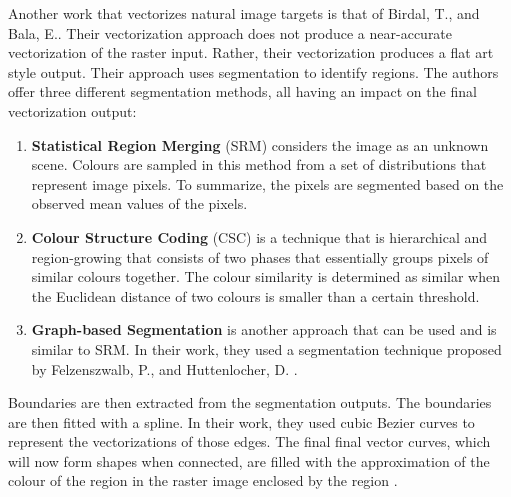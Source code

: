 Another work that vectorizes natural image targets is that of Birdal, T., and Bala, E.. Their vectorization approach does not produce a near-accurate vectorization of the raster input. Rather, their vectorization produces a flat art style output. Their approach uses segmentation to identify regions. The authors offer three different segmentation methods, all having an impact on the final vectorization output:

\begin{enumerate}
	\item \textbf{Statistical Region Merging} (SRM) considers the image as an unknown scene. Colours are sampled in this method from a set of distributions that represent image pixels. To summarize, the pixels are segmented based on the observed mean values of the pixels.
	
	\item \textbf{Colour Structure Coding} (CSC) is a technique that is hierarchical and region-growing that consists of two phases that essentially groups pixels of similar colours together. The colour similarity is determined as similar when the Euclidean distance of two colours is smaller than a certain threshold.
	
	\item \textbf{Graph-based Segmentation} is another approach that can be used and is similar to SRM. In their work, they used a segmentation technique proposed by Felzenszwalb, P., and Huttenlocher, D. \cite{efficientgraphbasedimagesegmentation}.
\end{enumerate}

Boundaries are then extracted from the segmentation outputs. The boundaries are then fitted with a spline. In their work, they used cubic Bezier curves to represent the vectorizations of those edges. The final final vector curves, which will now form shapes when connected, are filled with the approximation of the colour of the region in the raster image enclosed by the region \cite{anovelmethodforvectorization}.

